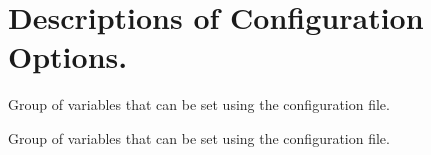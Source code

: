 \hypertarget{group__Config}{}\section{Descriptions of Configuration Options.}
\label{group__Config}


Group of variables that can be set using the configuration file.  


Group of variables that can be set using the configuration file. 

